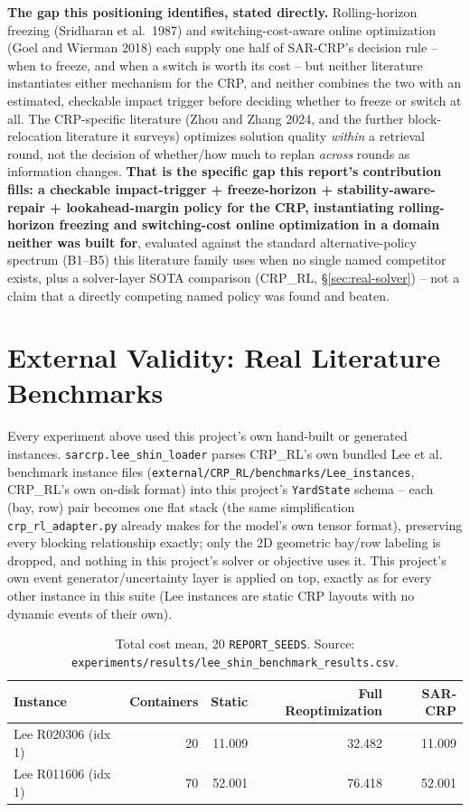 \documentclass[11pt]{article}
\begin{document}
\textbf{The gap this positioning identifies, stated directly.} Rolling-horizon
freezing (Sridharan et al.\ 1987) and switching-cost-aware online
optimization (Goel and Wierman 2018) each supply one half of SAR-CRP's
decision rule -- when to freeze, and when a switch is worth its cost --
but neither literature instantiates either mechanism for the CRP, and
neither combines the two with an estimated, checkable impact trigger
before deciding whether to freeze or switch at all. The CRP-specific
literature (Zhou and Zhang 2024, and the further block-relocation
literature it surveys) optimizes solution quality \emph{within} a
retrieval round, not the decision of whether/how much to replan
\emph{across} rounds as information changes. \textbf{That is the
specific gap this report's contribution fills: a checkable
impact-trigger + freeze-horizon + stability-aware-repair + lookahead-margin
policy for the CRP, instantiating rolling-horizon freezing and
switching-cost online optimization in a domain neither was built for},
evaluated against the standard alternative-policy spectrum (B1--B5) this
literature family uses when no single named competitor exists, plus a
solver-layer SOTA comparison (CRP\_RL, \S\ref{sec:real-solver}) -- not a
claim that a directly competing named policy was found and beaten.

\section{External Validity: Real Literature Benchmarks}
\label{sec:lee-shin}

Every experiment above used this project's own hand-built or generated
instances. \texttt{sarcrp.lee\_shin\_loader} parses CRP\_RL's own bundled
Lee et al.~\cite{lee2010} benchmark instance files
(\texttt{external/CRP\_RL/benchmarks/Lee\_instances}, CRP\_RL's own
on-disk format) into this project's \texttt{YardState} schema -- each
(bay, row) pair becomes one flat stack (the same simplification
\texttt{crp\_rl\_adapter.py} already makes for the model's own tensor
format), preserving every blocking relationship exactly; only the 2D
geometric bay/row labeling is dropped, and nothing in this project's
solver or objective uses it. This project's own event generator/uncertainty
layer is applied on top, exactly as for every other instance in this
suite (Lee instances are static CRP layouts with no dynamic events of
their own).

\begin{table}[h]
\centering
\small
\begin{tabular}{lrrrr}
\hline
Instance & Containers & Static & Full Reoptimization & SAR-CRP \\
\hline
Lee R020306 (idx 1) & 20 & 11.009 & 32.482 & 11.009 \\
Lee R011606 (idx 1) & 70 & 52.001 & 76.418 & 52.001 \\
\hline
\end{tabular}
\caption{Total cost mean, 20 \texttt{REPORT\_SEEDS}. Source: \texttt{experiments/results/lee\_shin\_benchmark\_results.csv}.}
\end{table}
\end{document}
